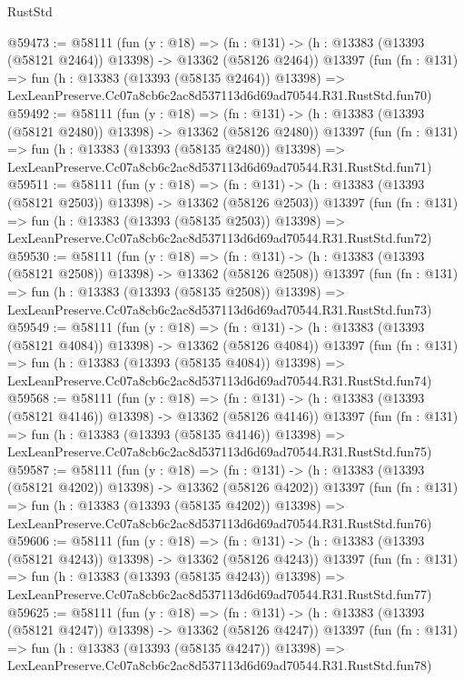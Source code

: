 \begin{lexlean}{RustStd}
\begin{coremodule}
@59473 := @58111
    (fun (y : @18) =>
    (fn : @131) -> (h : @13383 (@13393 (@58121 @2464)) @13398) -> @13362 (@58126 @2464))
    @13397
    (fun (fn : @131) =>
    fun (h : @13383 (@13393 (@58135 @2464)) @13398) =>
    LexLeanPreserve.Cc07a8cb6c2ac8d537113d6d69ad70544.R31.RustStd.fun70)
@59492 := @58111
    (fun (y : @18) =>
    (fn : @131) -> (h : @13383 (@13393 (@58121 @2480)) @13398) -> @13362 (@58126 @2480))
    @13397
    (fun (fn : @131) =>
    fun (h : @13383 (@13393 (@58135 @2480)) @13398) =>
    LexLeanPreserve.Cc07a8cb6c2ac8d537113d6d69ad70544.R31.RustStd.fun71)
@59511 := @58111
    (fun (y : @18) =>
    (fn : @131) -> (h : @13383 (@13393 (@58121 @2503)) @13398) -> @13362 (@58126 @2503))
    @13397
    (fun (fn : @131) =>
    fun (h : @13383 (@13393 (@58135 @2503)) @13398) =>
    LexLeanPreserve.Cc07a8cb6c2ac8d537113d6d69ad70544.R31.RustStd.fun72)
@59530 := @58111
    (fun (y : @18) =>
    (fn : @131) -> (h : @13383 (@13393 (@58121 @2508)) @13398) -> @13362 (@58126 @2508))
    @13397
    (fun (fn : @131) =>
    fun (h : @13383 (@13393 (@58135 @2508)) @13398) =>
    LexLeanPreserve.Cc07a8cb6c2ac8d537113d6d69ad70544.R31.RustStd.fun73)
@59549 := @58111
    (fun (y : @18) =>
    (fn : @131) -> (h : @13383 (@13393 (@58121 @4084)) @13398) -> @13362 (@58126 @4084))
    @13397
    (fun (fn : @131) =>
    fun (h : @13383 (@13393 (@58135 @4084)) @13398) =>
    LexLeanPreserve.Cc07a8cb6c2ac8d537113d6d69ad70544.R31.RustStd.fun74)
@59568 := @58111
    (fun (y : @18) =>
    (fn : @131) -> (h : @13383 (@13393 (@58121 @4146)) @13398) -> @13362 (@58126 @4146))
    @13397
    (fun (fn : @131) =>
    fun (h : @13383 (@13393 (@58135 @4146)) @13398) =>
    LexLeanPreserve.Cc07a8cb6c2ac8d537113d6d69ad70544.R31.RustStd.fun75)
@59587 := @58111
    (fun (y : @18) =>
    (fn : @131) -> (h : @13383 (@13393 (@58121 @4202)) @13398) -> @13362 (@58126 @4202))
    @13397
    (fun (fn : @131) =>
    fun (h : @13383 (@13393 (@58135 @4202)) @13398) =>
    LexLeanPreserve.Cc07a8cb6c2ac8d537113d6d69ad70544.R31.RustStd.fun76)
@59606 := @58111
    (fun (y : @18) =>
    (fn : @131) -> (h : @13383 (@13393 (@58121 @4243)) @13398) -> @13362 (@58126 @4243))
    @13397
    (fun (fn : @131) =>
    fun (h : @13383 (@13393 (@58135 @4243)) @13398) =>
    LexLeanPreserve.Cc07a8cb6c2ac8d537113d6d69ad70544.R31.RustStd.fun77)
@59625 := @58111
    (fun (y : @18) =>
    (fn : @131) -> (h : @13383 (@13393 (@58121 @4247)) @13398) -> @13362 (@58126 @4247))
    @13397
    (fun (fn : @131) =>
    fun (h : @13383 (@13393 (@58135 @4247)) @13398) =>
    LexLeanPreserve.Cc07a8cb6c2ac8d537113d6d69ad70544.R31.RustStd.fun78)

\end{coremodule}
\end{lexlean}

